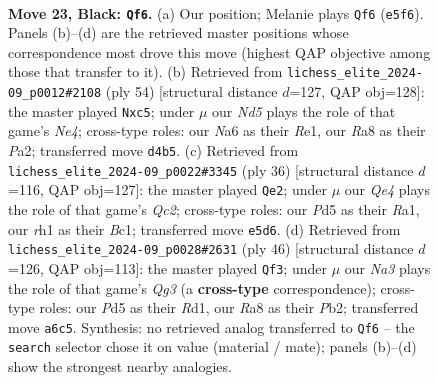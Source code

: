 \documentclass[11pt]{article}
\begin{document}
\clearpage

\begin{figure}[p]\centering
\begin{subfigure}{0.46\textwidth}\centering
\resizebox{\linewidth}{!}{%
\newchessgame
\chessboard[
  setfen={r1b2k2/pp3pp1/n3p3/3pq3/3nr3/PPQ5/2N3PP/R2K2NR b - - 3 23},
  showmover=false,
  pgfstyle=straightmove, color=movearrow, markmove={e5-f6}
]}
\caption{}
\end{subfigure}\hfill
\begin{subfigure}{0.46\textwidth}\centering
\resizebox{\linewidth}{!}{%
\newchessgame
\chessboard[
  setfen={4r1k1/ppp1r3/6pp/2nP1q2/2P1Np2/2P4P/P1Q1R1P1/4R1K1 w - - 1 28},
  showmover=false,
  pgfstyle=straightmove, color=movearrow, markmove={e4-c5}
]}
\caption{}
\end{subfigure}
\\[4pt]
\begin{subfigure}{0.46\textwidth}\centering
\resizebox{\linewidth}{!}{%
\newchessgame
\chessboard[
  setfen={r6r/1pp1b1k1/p1n2n1p/5q2/3PN3/2P5/PPQ3PP/R1B1R1K1 w - - 1 19},
  showmover=false,
  pgfstyle=straightmove, color=movearrow, markmove={c2-e2}
]}
\caption{}
\end{subfigure}\hfill
\begin{subfigure}{0.46\textwidth}\centering
\resizebox{\linewidth}{!}{%
\newchessgame
\chessboard[
  setfen={r2r1b1k/p2q3p/R2N1p2/1np1p3/2N5/2P3Q1/1P3PPP/3R2K1 w - - 0 24},
  showmover=false,
  pgfstyle=straightmove, color=movearrow, markmove={g3-f3}
]}
\caption{}
\end{subfigure}
\caption{\textbf{Move 23, Black: \texttt{Qf6}.} (a) Our position; Melanie plays \texttt{Qf6} (\texttt{e5f6}). Panels (b)--(d) are the retrieved master positions whose correspondence most drove this move (highest QAP objective among those that transfer to it). (b) Retrieved from \texttt{lichess\_elite\_2024-09\_p0012\#2108} (ply 54) [structural distance $d$=127, QAP obj=128]: the master played \texttt{Nxc5}; under $\mu$ our \emph{Nd5} plays the role of that game's \emph{Ne4}; cross-type roles: our \emph{N}a6 as their \emph{R}e1, our \emph{R}a8 as their \emph{P}a2; transferred move \texttt{d4b5}. (c) Retrieved from \texttt{lichess\_elite\_2024-09\_p0022\#3345} (ply 36) [structural distance $d$=116, QAP obj=127]: the master played \texttt{Qe2}; under $\mu$ our \emph{Qe4} plays the role of that game's \emph{Qc2}; cross-type roles: our \emph{P}d5 as their \emph{R}a1, our \emph{r}h1 as their \emph{B}c1; transferred move \texttt{e5d6}. (d) Retrieved from \texttt{lichess\_elite\_2024-09\_p0028\#2631} (ply 46) [structural distance $d$=126, QAP obj=113]: the master played \texttt{Qf3}; under $\mu$ our \emph{Na3} plays the role of that game's \emph{Qg3} (a \textbf{cross-type} correspondence); cross-type roles: our \emph{P}d5 as their \emph{R}d1, our \emph{R}a8 as their \emph{P}b2; transferred move \texttt{a6c5}. Synthesis: no retrieved analog transferred to \texttt{Qf6} -- the \texttt{search} selector chose it on value (material / mate); panels (b)--(d) show the strongest nearby analogies.}
\label{fig:thought-m45}
\end{figure}
\end{document}
